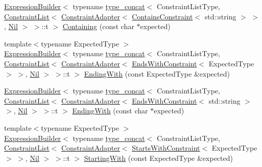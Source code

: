 \begin{DoxyCompactItemize}
\item 
\mbox{\hyperlink{structsnowhouse_1_1ExpressionBuilder}{Expression\+Builder}}$<$ typename \mbox{\hyperlink{structsnowhouse_1_1type__concat}{type\+\_\+concat}}$<$ Constraint\+List\+Type, \mbox{\hyperlink{structsnowhouse_1_1ConstraintList}{Constraint\+List}}$<$ \mbox{\hyperlink{structsnowhouse_1_1ConstraintAdapter}{Constraint\+Adapter}}$<$ \mbox{\hyperlink{structsnowhouse_1_1ContainsConstraint}{Contains\+Constraint}}$<$ std\+::string $>$ $>$, \mbox{\hyperlink{structsnowhouse_1_1Nil}{Nil}} $>$ $>$\+::t $>$ \mbox{\hyperlink{structsnowhouse_1_1ExpressionBuilder_a60972f18f9d4791be8052f0ad2bedd64}{Containing}} (const char $\ast$expected)
\item 
{\footnotesize template$<$typename Expected\+Type $>$ }\\\mbox{\hyperlink{structsnowhouse_1_1ExpressionBuilder}{Expression\+Builder}}$<$ typename \mbox{\hyperlink{structsnowhouse_1_1type__concat}{type\+\_\+concat}}$<$ Constraint\+List\+Type, \mbox{\hyperlink{structsnowhouse_1_1ConstraintList}{Constraint\+List}}$<$ \mbox{\hyperlink{structsnowhouse_1_1ConstraintAdapter}{Constraint\+Adapter}}$<$ \mbox{\hyperlink{structsnowhouse_1_1EndsWithConstraint}{Ends\+With\+Constraint}}$<$ Expected\+Type $>$ $>$, \mbox{\hyperlink{structsnowhouse_1_1Nil}{Nil}} $>$ $>$\+::t $>$ \mbox{\hyperlink{structsnowhouse_1_1ExpressionBuilder_a8bc9046060cb71d275edf6541458ba6b}{Ending\+With}} (const Expected\+Type \&expected)
\item 
\mbox{\hyperlink{structsnowhouse_1_1ExpressionBuilder}{Expression\+Builder}}$<$ typename \mbox{\hyperlink{structsnowhouse_1_1type__concat}{type\+\_\+concat}}$<$ Constraint\+List\+Type, \mbox{\hyperlink{structsnowhouse_1_1ConstraintList}{Constraint\+List}}$<$ \mbox{\hyperlink{structsnowhouse_1_1ConstraintAdapter}{Constraint\+Adapter}}$<$ \mbox{\hyperlink{structsnowhouse_1_1EndsWithConstraint}{Ends\+With\+Constraint}}$<$ std\+::string $>$ $>$, \mbox{\hyperlink{structsnowhouse_1_1Nil}{Nil}} $>$ $>$\+::t $>$ \mbox{\hyperlink{structsnowhouse_1_1ExpressionBuilder_aee6bfa047a82f09500faed6cc5faedf3}{Ending\+With}} (const char $\ast$expected)
\item 
{\footnotesize template$<$typename Expected\+Type $>$ }\\\mbox{\hyperlink{structsnowhouse_1_1ExpressionBuilder}{Expression\+Builder}}$<$ typename \mbox{\hyperlink{structsnowhouse_1_1type__concat}{type\+\_\+concat}}$<$ Constraint\+List\+Type, \mbox{\hyperlink{structsnowhouse_1_1ConstraintList}{Constraint\+List}}$<$ \mbox{\hyperlink{structsnowhouse_1_1ConstraintAdapter}{Constraint\+Adapter}}$<$ \mbox{\hyperlink{structsnowhouse_1_1StartsWithConstraint}{Starts\+With\+Constraint}}$<$ Expected\+Type $>$ $>$, \mbox{\hyperlink{structsnowhouse_1_1Nil}{Nil}} $>$ $>$\+::t $>$ \mbox{\hyperlink{structsnowhouse_1_1ExpressionBuilder_a0482afe40b668c1a2eabe00426ada398}{Starting\+With}} (const Expected\+Type \&expected)

\end{DoxyCompactItemize}
